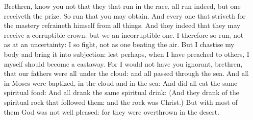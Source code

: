 \begin{multicols}{2}
Brethren, know you not that they that run in the race, all run indeed, but one receiveth
the prize. So run that you may obtain.  And every one that striveth for the
mastery refraineth himself from all things. And they indeed that they may
receive a corruptible crown: but we an incorruptible one.  I therefore so run,
not as at an uncertainty: I so fight, not as one beating the air.  But I
chastise my body and bring it into subjection: lest perhaps, when I have
preached to others, I myself should become a castaway.   For I would not have you
ignorant, brethren, that our fathers were all under the cloud: and all passed
through the sea.  And all in Moses were baptized, in the cloud and in the sea:
 And did all eat
the same spiritual food: And all drank the same spiritual drink: (And they
drank of the spiritual rock that followed them: and the rock was Christ.) But
with most of them God was not well pleased: for they were overthrown in the
desert.




\end{multicols}

